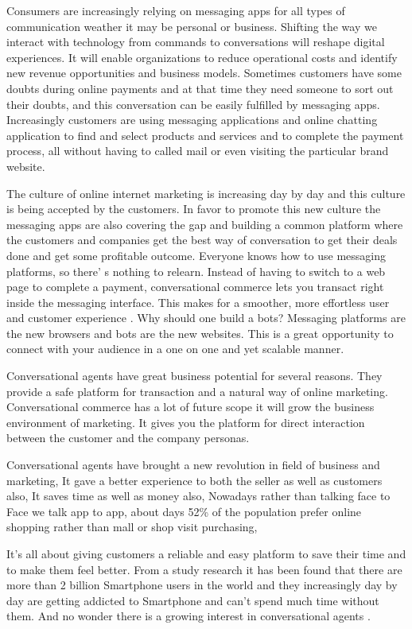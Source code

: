 



Consumers are increasingly relying on messaging apps for all types of communication weather it may be personal or business.
Shifting the way we interact with technology from commands to conversations will reshape digital experiences. It will enable organizations to reduce operational costs and identify new revenue opportunities and business models. Sometimes customers have some doubts during online payments and at that time they need someone to sort out their doubts, and this conversation can be easily fulfilled by messaging apps. Increasingly customers are using messaging applications and online chatting application to find and select products and services and to complete the payment process, all without having to called mail or even visiting the particular brand website. 

The culture of online internet marketing is increasing day by day and this culture is being accepted by the customers. In favor to promote this new culture the messaging apps are also covering the gap and building a common platform where the customers and companies get the best way of conversation to get their deals done and get some profitable outcome. Everyone knows how to use messaging platforms, so there' s nothing to relearn. Instead of having to switch to a web page to complete a payment, conversational commerce lets you transact right inside the messaging interface. This makes for a smoother, more effortless user and customer experience \cite{piyush2016}. Why should one build a bots? Messaging platforms are the new browsers and bots are the new websites. This is a great opportunity to connect with your audience in a one on one and yet scalable manner.

Conversational agents have great business potential for several reasons. They provide a safe platform for transaction and a natural way of online marketing. Conversational commerce has a lot of future scope it will grow the business environment of marketing. It gives you the platform for direct interaction between the customer and the company personas.

Conversational agents have brought a new revolution in field of business and marketing, It gave a better experience to both the seller as well as customers also, It saves time as well as money also, Nowadays rather than talking face to Face we talk app to app, about days 52\% of the population prefer online shopping rather than mall or shop visit purchasing,

It's all about giving customers a reliable and easy platform to save their time and to make them feel better. From a study research it has been found that there are more than 2 billion Smartphone users in the world and they increasingly day by day are getting addicted to Smartphone and can't spend much time without them. And no wonder there is a growing interest in conversational agents \cite{piyush2016}.